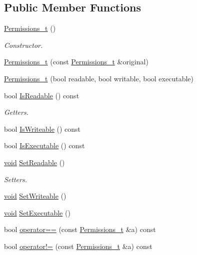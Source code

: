 \subsection*{Public Member Functions}
\begin{DoxyCompactItemize}
\item 
\hyperlink{structmodel_1_1_permissions__t_abde46b692b7ae4f98b09031b48ba2ef4}{Permissions\+\_\+t} ()
\begin{DoxyCompactList}\small\item\em Constructor. \end{DoxyCompactList}\item 
\hyperlink{structmodel_1_1_permissions__t_abd45c6b65d509a6c12729bdd6f990a43}{Permissions\+\_\+t} (const \hyperlink{structmodel_1_1_permissions__t}{Permissions\+\_\+t} \&original)
\item 
\hyperlink{structmodel_1_1_permissions__t_ac4d7e1573b9029f8c5ffbdad266b08a5}{Permissions\+\_\+t} (bool readable, bool writable, bool executable)
\item 
bool \hyperlink{structmodel_1_1_permissions__t_a3db9fdcfe79a828c9636c5f95c0b3234}{Is\+Readable} () const 
\begin{DoxyCompactList}\small\item\em Getters. \end{DoxyCompactList}\item 
bool \hyperlink{structmodel_1_1_permissions__t_a41de7a15eb3fc072cbbf12bc303b0874}{Is\+Writeable} () const 
\item 
bool \hyperlink{structmodel_1_1_permissions__t_aae0a9e75b90a82bc819de89b35a023e0}{Is\+Executable} () const 
\item 
\hyperlink{_t_e_m_p_l_a_t_e__cdef_8h_ac9c84fa68bbad002983e35ce3663c686}{void} \hyperlink{structmodel_1_1_permissions__t_ae0db9ffd9bf50f11284e36503d094a1a}{Set\+Readable} ()
\begin{DoxyCompactList}\small\item\em Setters. \end{DoxyCompactList}\item 
\hyperlink{_t_e_m_p_l_a_t_e__cdef_8h_ac9c84fa68bbad002983e35ce3663c686}{void} \hyperlink{structmodel_1_1_permissions__t_a074ad18b4ef5ff7cc426437d40ca1281}{Set\+Writeable} ()
\item 
\hyperlink{_t_e_m_p_l_a_t_e__cdef_8h_ac9c84fa68bbad002983e35ce3663c686}{void} \hyperlink{structmodel_1_1_permissions__t_adb1652c34aa6b0bc65685e1d6e145bff}{Set\+Executable} ()
\item 
bool \hyperlink{structmodel_1_1_permissions__t_ac698a8193176b0eb012c97dce2310c13}{operator==} (const \hyperlink{structmodel_1_1_permissions__t}{Permissions\+\_\+t} \&a) const 
\item 
bool \hyperlink{structmodel_1_1_permissions__t_a47712ec37ba3205d32e6ea6382f8ad71}{operator!=} (const \hyperlink{structmodel_1_1_permissions__t}{Permissions\+\_\+t} \&a) const 
\end{DoxyCompactItemize}
